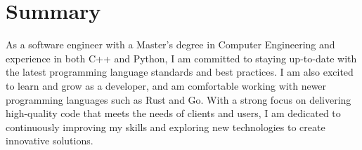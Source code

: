 \section{Summary}

\begin{itemize}
    \cvitem
        {As a software engineer with a Master's degree in Computer Engineering and experience in both C++ and Python, I am committed to staying up-to-date with the latest programming language standards and best practices. I am also excited to learn and grow as a developer, and am comfortable working with newer programming languages such as Rust and Go. With a strong focus on delivering high-quality code that meets the needs of clients and users, I am dedicated to continuously improving my skills and exploring new technologies to create innovative solutions.}
\end{itemize}
